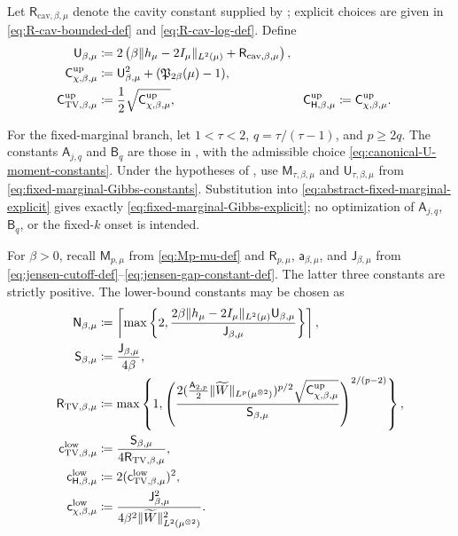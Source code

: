 \documentclass[11pt,reqno]{amsart}
\numberwithin{equation}{section}
\theoremstyle{plain}
\theoremstyle{remark}
\DeclarePairedDelimiter{\pa}{\lparen}{\rparen}
\DeclarePairedDelimiter{\norm}{\lVert}{\rVert}
\newcommand{\tl}{\widetilde}
\newcommand{\Hr}{{\mathsf{H}}}
\newcommand{\be}{\beta}
\newcommand{\TV}{\operatorname{TV}}
\begin{document}
Let \(\mathsf R_{\mathrm{cav},\be,\mu}\) denote the cavity constant supplied by ; explicit choices are given in \eqref{eq:R-cav-bounded-def} and \eqref{eq:R-cav-log-def}.  Define
\begin{align}\label{eq:upper-constant-defs}
 \mathsf U_{\be,\mu}
 &\coloneqq
 2\left(
 \be\norm{h_\mu-2I_\mu}_{L^2(\mu)}
 +\mathsf R_{\mathrm{cav},\be,\mu}
 \right),\\
 \mathsf C_{\chi,\be,\mu}^{\mathrm{up}}
 &\coloneqq\mathsf U_{\be,\mu}^2+\pa{\mathfrak P_{2\be}(\mu)-1},\\
 \mathsf C_{\TV,\be,\mu}^{\mathrm{up}}
 &\coloneqq\frac12\sqrt{\mathsf C_{\chi,\be,\mu}^{\mathrm{up}}},
 &
 \mathsf C_{\Hr,\be,\mu}^{\mathrm{up}}
 &\coloneqq\mathsf C_{\chi,\be,\mu}^{\mathrm{up}}.
\end{align}

For the fixed-marginal branch, let \(1<\tau<2\), \(q=\tau/(\tau-1)\), and \(p\ge2q\).  The constants \(\mathsf A_{j,q}\) and \(\mathsf B_q\) are those in , with the admissible choice \eqref{eq:canonical-U-moment-constants}.  Under the hypotheses of , use \(\mathsf M_{\tau,\be,\mu}\) and \(\mathsf U_{\tau,\be,\mu}\) from \eqref{eq:fixed-marginal-Gibbs-constants}.  Substitution into \eqref{eq:abstract-fixed-marginal-explicit} gives exactly \eqref{eq:fixed-marginal-Gibbs-explicit}; no optimization of \(\mathsf A_{j,q}\), \(\mathsf B_q\), or the fixed-\(k\) onset is intended.

For \(\be>0\), recall \(\mathsf M_{p,\mu}\) from
\eqref{eq:Mp-mu-def} and \(\mathsf R_{p,\mu}\),
\(\mathsf a_{\be,\mu}\), and \(\mathsf J_{\be,\mu}\) from
\eqref{eq:jensen-cutoff-def}--\eqref{eq:jensen-gap-constant-def}.  The latter
three constants are strictly positive.  The lower-bound constants may be
chosen as
\begin{align}
 \mathsf N_{\be,\mu}
 &\coloneqq
 \left\lceil\max\left\{2,
 \frac{2\be\norm{h_\mu-2I_\mu}_{L^2(\mu)}\mathsf U_{\be,\mu}}
 {\mathsf J_{\be,\mu}}\right\}\right\rceil,
 \label{eq:lower-constant-N}\\
 \mathsf S_{\be,\mu}
 &\coloneqq\frac{\mathsf J_{\be,\mu}}{4\be},
 \label{eq:lower-constant-S}\\
 \mathsf R_{\TV,\be,\mu}
 &\coloneqq
 \max\left\{1,
 \left(\frac{2\pa{\frac{\mathsf A_{2,p}}2\norm{\tl W}_{L^p(\mu^{\otimes2})}}^{p/2}
 \sqrt{\mathsf C_{\chi,\be,\mu}^{\mathrm{up}}}}
 {\mathsf S_{\be,\mu}}\right)^{2/(p-2)}\right\},
 \label{eq:lower-constant-R-TV}\\
 \mathsf c_{\TV,\be,\mu}^{\mathrm{low}}
 &\coloneqq\frac{\mathsf S_{\be,\mu}}{4\mathsf R_{\TV,\be,\mu}},
 \label{eq:lower-constant-c-TV}\\
 \mathsf c_{\Hr,\be,\mu}^{\mathrm{low}}
 &\coloneqq2\pa{\mathsf c_{\TV,\be,\mu}^{\mathrm{low}}}^2,
 \label{eq:lower-constant-c-H}\\
 \mathsf c_{\chi,\be,\mu}^{\mathrm{low}}
 &\coloneqq
 \frac{\mathsf J_{\be,\mu}^2}
 {4\be^2\norm{\tl W}_{L^2(\mu^{\otimes2})}^2}.
 \label{eq:lower-constant-c-chi}
\end{align}
\end{document}
